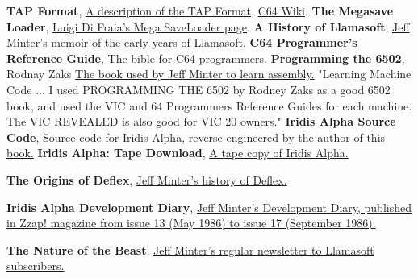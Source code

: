 \renewcommand{\bibname}{Notes \&\ References}
\begin{thebibliography}{999}


  \textbf{TAP Format},
  \href{http://unusedino.de/ec64/technical/formats/tap.html}{A description of the TAP Format},
  \href{https://www.c64-wiki.com/wiki/TAP}{C64 Wiki}.
  \textbf{The Megasave Loader},
  \href{https://www.luigidifraia.com/doku/doku.php?id=commodore:tapes:loaders:mega-save}{Luigi Di Fraia's Mega SaveLoader page}.
  \textbf{A History of Llamasoft},
  \href{http://minotaurproject.co.uk/YakImages/AHistoryofLlamasoft.pdf}{Jeff Minter's memoir of the early years of Llamasoft}.
  \textbf{C64 Programmer's Reference Guide},
  \href{https://archive.org/details/c64-programmer-ref}{The bible for C64 programmers}.
  \textbf{Programming the 6502}, Rodnay Zaks
  \href{https://archive.org/details/Programming_the_6502_OCR}{The book used by Jeff Minter to learn assembly.} "Learning Machine Code ... I used PROGRAMMING THE 6502 by Rodney Zaks as a good 6502 book, and used the VIC and 64 Programmers Reference Guides for each machine. The VIC REVEALED is also good for VIC 20 owners."
  \textbf{Iridis Alpha Source Code},
  \href{https://github.com/mwenge/iridisalpha}{Source code for Iridis Alpha, reverse-engineered by the author of this book.}
  \textbf{Iridis Alpha: Tape Download},
  \href{http://www.llamasoftarchive.org/oldsite/llamasoft/cbm64/IridisAlpha.zip}{A tape copy of Iridis Alpha.}

  \textbf{The Origins of Deflex},
  \href{https://web.archive.org/web/20230811235533/https://stinkygoat.livejournal.com/211183.html}{Jeff Minter's history of Deflex.}

  \textbf{Iridis Alpha Development Diary},
    \href{https://web.archive.org/web/20230322100622/https://codetapper.com/c64/diary-of-a-game/iridis-alpha/}{Jeff Minter's Development Diary, published in Zzap! magazine from issue 13 (May 1986) to issue 17 (September 1986).}

  \textbf{The Nature of the Beast},
    \href{https://web.archive.org/web/20230322100622/https://codetapper.com/c64/diary-of-a-game/iridis-alpha/}{ Jeff Minter's regular newsletter to Llamasoft subscribers.}
\end{thebibliography}
